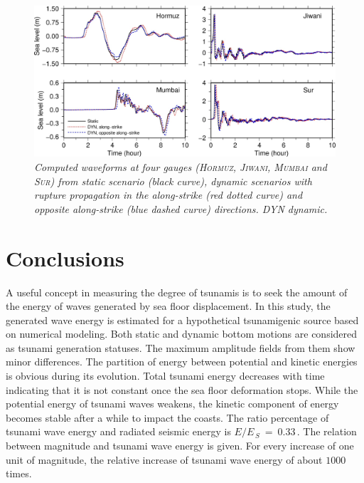 \documentclass[12pt]{llncs}
\begin{document}
\begin{figure}
\centering
\includegraphics[scale=2.3]{Fig11.jpg}
\caption{\small\em Computed waveforms at four gauges (\textsc{Hormuz}, \textsc{Jiwani}, \textsc{Mumbai} and \textsc{Sur}) from static scenario (black curve), dynamic scenarios with rupture propagation in the along-strike (red dotted curve) and opposite along-strike (blue dashed curve) directions. DYN dynamic.}
\label{fig:seri}
\end{figure}


\section{Conclusions}

A useful concept in measuring the degree of tsunamis is to seek the amount of the energy of waves generated by sea floor displacement. In this study, the generated wave energy is estimated for a hypothetical tsunamigenic source based on numerical modeling. Both static and dynamic bottom motions are considered as tsunami generation statuses. The maximum amplitude fields from them show minor differences. The partition of energy between potential and kinetic energies is obvious during its evolution. Total tsunami energy decreases with time indicating that it is not constant once the sea floor deformation stops. While the potential energy of tsunami waves weakens, the kinetic component of energy becomes stable after a while to impact the coasts. The ratio percentage of tsunami wave energy and radiated seismic energy is $E/E_{\,S}\ =\ 0.33\,$. The relation between magnitude and tsunami wave energy is given. For every increase of one unit of magnitude, the relative increase of tsunami wave energy of about $1000$ times.

\bigskip
\renewcommand{\bibsection}{\section*{References}}

\bigskip
\end{document}
